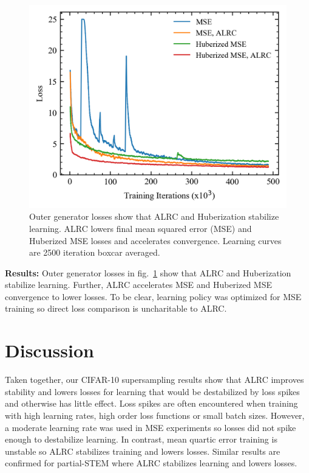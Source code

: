 \documentclass[letterpaper, 10 pt, conference]{ieeeconf}  %
\newcommand\extraspace{3pt}
\begin{document}
\begin{figure}[htbp]
\centering
\includegraphics[width=0.97\columnwidth]{stability.png}
\caption{ Outer generator losses show that ALRC and Huberization stabilize learning. ALRC lowers final mean squared error (MSE) and Huberized MSE losses and accelerates convergence. Learning curves are 2500 iteration boxcar averaged. }
\label{stability}
\end{figure}

\vspace{\extraspace}
\noindent\textbf{Results:} Outer generator losses in fig.~\ref{stability} show that ALRC and Huberization stabilize learning. Further, ALRC accelerates MSE and Huberized MSE convergence to lower losses. To be clear, learning policy was optimized for MSE training so direct loss comparison is uncharitable to ALRC.

\section{Discussion}

Taken together, our CIFAR-10 supersampling results show that ALRC improves stability and lowers losses for learning that would be destabilized by loss spikes and otherwise has little effect. Loss spikes are often encountered when training with high learning rates, high order loss functions or small batch sizes. However, a moderate learning rate was used in MSE experiments so losses did not spike enough to destabilize learning. In contrast, mean quartic error training is unstable so ALRC stabilizes training and lowers losses. Similar results are confirmed for partial-STEM where ALRC stabilizes learning and lowers losses.
\end{document}
